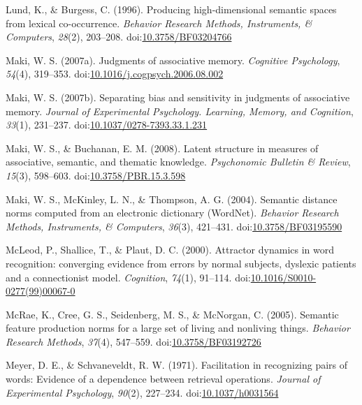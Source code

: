 \documentclass[english,,man]{apa6}
\begin{document}
\hypertarget{ref-Lund1996}{}
Lund, K., \& Burgess, C. (1996). Producing high-dimensional semantic
spaces from lexical co-occurrence. \emph{Behavior Research Methods,
Instruments, \& Computers}, \emph{28}(2), 203--208.
doi:\href{https://doi.org/10.3758/BF03204766}{10.3758/BF03204766}

\hypertarget{ref-Maki2007a}{}
Maki, W. S. (2007a). Judgments of associative memory. \emph{Cognitive
Psychology}, \emph{54}(4), 319--353.
doi:\href{https://doi.org/10.1016/j.cogpsych.2006.08.002}{10.1016/j.cogpsych.2006.08.002}

\hypertarget{ref-Maki2007}{}
Maki, W. S. (2007b). Separating bias and sensitivity in judgments of
associative memory. \emph{Journal of Experimental Psychology. Learning,
Memory, and Cognition}, \emph{33}(1), 231--237.
doi:\href{https://doi.org/10.1037/0278-7393.33.1.231}{10.1037/0278-7393.33.1.231}

\hypertarget{ref-Maki2008}{}
Maki, W. S., \& Buchanan, E. M. (2008). Latent structure in measures of
associative, semantic, and thematic knowledge. \emph{Psychonomic
Bulletin \& Review}, \emph{15}(3), 598--603.
doi:\href{https://doi.org/10.3758/PBR.15.3.598}{10.3758/PBR.15.3.598}

\hypertarget{ref-Maki2004}{}
Maki, W. S., McKinley, L. N., \& Thompson, A. G. (2004). Semantic
distance norms computed from an electronic dictionary (WordNet).
\emph{Behavior Research Methods, Instruments, \& Computers},
\emph{36}(3), 421--431.
doi:\href{https://doi.org/10.3758/BF03195590}{10.3758/BF03195590}

\hypertarget{ref-McLeod2000}{}
McLeod, P., Shallice, T., \& Plaut, D. C. (2000). Attractor dynamics in
word recognition: converging evidence from errors by normal subjects,
dyslexic patients and a connectionist model. \emph{Cognition},
\emph{74}(1), 91--114.
doi:\href{https://doi.org/10.1016/S0010-0277(99)00067-0}{10.1016/S0010-0277(99)00067-0}

\hypertarget{ref-McRae2005}{}
McRae, K., Cree, G. S., Seidenberg, M. S., \& McNorgan, C. (2005).
Semantic feature production norms for a large set of living and
nonliving things. \emph{Behavior Research Methods}, \emph{37}(4),
547--559.
doi:\href{https://doi.org/10.3758/BF03192726}{10.3758/BF03192726}

\hypertarget{ref-Meyer1971}{}
Meyer, D. E., \& Schvaneveldt, R. W. (1971). Facilitation in recognizing
pairs of words: Evidence of a dependence between retrieval operations.
\emph{Journal of Experimental Psychology}, \emph{90}(2), 227--234.
doi:\href{https://doi.org/10.1037/h0031564}{10.1037/h0031564}
\end{document}
